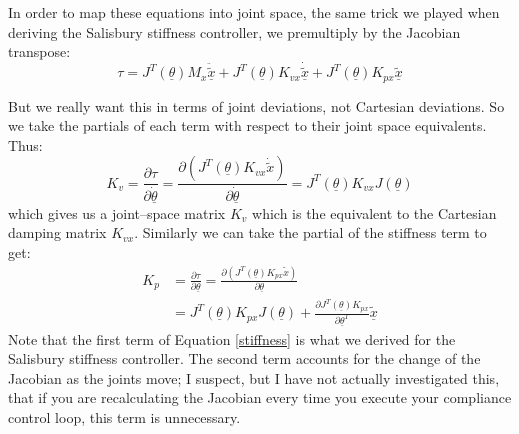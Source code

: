 \documentclass[]{article}
\begin{document}
In order to map these equations into joint space, the same trick we played when deriving the Salisbury stiffness controller, we premultiply by the Jacobian transpose:
\begin{equation}
 \tau = J^{T}(\underline{\theta})M_{x} \ddot{\tilde{\underline{x}}} + J^{T}(\underline{\theta})K_{vx}\dot{\tilde{\underline{x}}} + J^{T}(\underline{\theta})K_{px}\tilde{ \underline{x}}
\end{equation}

But we really want this in terms of joint deviations, not Cartesian deviations. So we take the partials of each term with respect to their joint space equivalents. Thus:
\begin{equation}
 K_{v} = \frac{\partial \tau}{\partial\underline{\dot{\theta}}} = \frac{\partial( J^{T}(\underline{\theta})K_{vx}\dot{\tilde{x}})}{\partial\underline{\dot{\theta}}} = J^{T}(\underline{\theta})K_{vx}J(\underline{\theta}) \label{damping}
\end{equation}
which gives us a joint--space matrix $K_{v}$ which is the equivalent to the Cartesian damping matrix $K_{vx}$. Similarly we can take the partial of the stiffness term to get:
\begin{equation}
\begin{split}
    K_{p} & = \frac{\partial \tau}{\partial\underline{\theta}} = \frac{\partial ( J^{T}(\underline{\theta})K_{px}\tilde{x})}{\partial\underline{\theta}}\\ & = J^{T}(\underline{\theta})K_{px}J(\underline{\theta}) + \frac{\partial J^{T}(\underline{\theta})K_{px}}{\partial \underline{\theta}^{T}}\tilde{\underline{x}} \label{stiffness}
\end{split}
\end{equation}
Note that the first term of Equation \ref{stiffness} is what we derived for the Salisbury stiffness controller. The second term accounts for the change of the Jacobian as the joints move; I suspect, but I have not actually investigated this, that if you are recalculating the Jacobian every time you execute your compliance control loop, this term is unnecessary.
\end{document}
